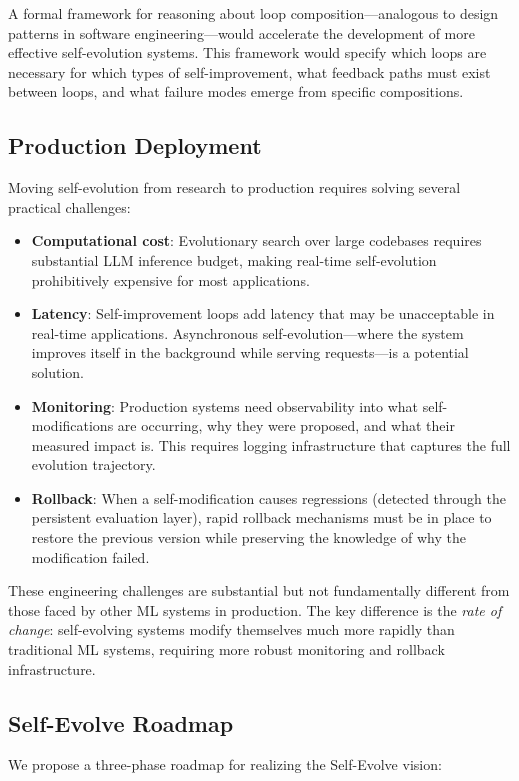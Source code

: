 \documentclass[11pt,a4paper]{article}
\begin{document}
A formal framework for reasoning about loop composition---analogous to design patterns in software engineering---would accelerate the development of more effective self-evolution systems. This framework would specify which loops are necessary for which types of self-improvement, what feedback paths must exist between loops, and what failure modes emerge from specific compositions.

\subsection{Production Deployment}

Moving self-evolution from research to production requires solving several practical challenges:
\begin{itemize}
\item \textbf{Computational cost}: Evolutionary search over large codebases requires substantial LLM inference budget, making real-time self-evolution prohibitively expensive for most applications.
\item \textbf{Latency}: Self-improvement loops add latency that may be unacceptable in real-time applications. Asynchronous self-evolution---where the system improves itself in the background while serving requests---is a potential solution.
\item \textbf{Monitoring}: Production systems need observability into what self-modifications are occurring, why they were proposed, and what their measured impact is. This requires logging infrastructure that captures the full evolution trajectory.
\item \textbf{Rollback}: When a self-modification causes regressions (detected through the persistent evaluation layer), rapid rollback mechanisms must be in place to restore the previous version while preserving the knowledge of why the modification failed.
\end{itemize}
These engineering challenges are substantial but not fundamentally different from those faced by other ML systems in production. The key difference is the \emph{rate of change}: self-evolving systems modify themselves much more rapidly than traditional ML systems, requiring more robust monitoring and rollback infrastructure.

\subsection{Self-Evolve Roadmap}

We propose a three-phase roadmap for realizing the Self-Evolve vision:
\end{document}
